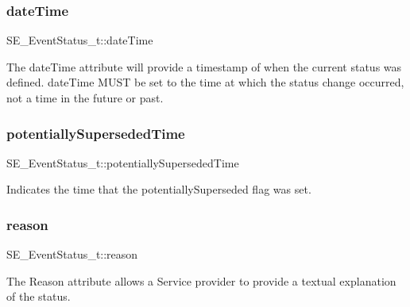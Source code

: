 \subsubsection{\texorpdfstring{date\+Time}{dateTime}}
{\footnotesize\ttfamily S\+E\+\_\+\+Event\+Status\+\_\+t\+::date\+Time}

The date\+Time attribute will provide a timestamp of when the current status was defined. date\+Time M\+U\+ST be set to the time at which the status change occurred, not a time in the future or past. \mbox{\label{group__EventStatus_ga54eb494ef98025237ddfd1959e20eecd}} 
\subsubsection{\texorpdfstring{potentially\+Superseded\+Time}{potentiallySupersededTime}}
{\footnotesize\ttfamily S\+E\+\_\+\+Event\+Status\+\_\+t\+::potentially\+Superseded\+Time}

Indicates the time that the potentially\+Superseded flag was set. \mbox{\label{group__EventStatus_ga30cb8c829f1f7458598572c159ccae98}} 
\subsubsection{\texorpdfstring{reason}{reason}}
{\footnotesize\ttfamily S\+E\+\_\+\+Event\+Status\+\_\+t\+::reason}

The Reason attribute allows a Service provider to provide a textual explanation of the status. 